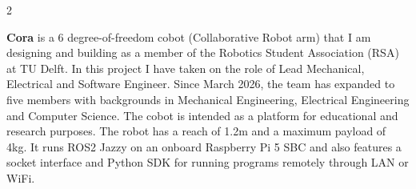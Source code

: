 \documentclass[8pt, a4paper, withhyper]{altacv}
\begin{document}
   


  \makecvheader


  \begin{paracol}
    {2}





    
     {}    
    \textbf{Cora} is a 6 degree-of-freedom cobot (Collaborative Robot arm) that I am
    designing and building as a member of the Robotics Student Association (RSA)
    at TU Delft. In this project I have taken on the role of Lead Mechanical,
    Electrical and Software Engineer. Since March 2026, the team has expanded 
    to five members with backgrounds in Mechanical Engineering, 
    Electrical Engineering and Computer Science.
    The cobot is intended as a platform for educational and research purposes.
    The robot has a reach of 1.2m and a maximum payload of 4kg.
    It runs ROS2 Jazzy on an onboard Raspberry Pi 5 SBC
    and also features a socket interface and Python SDK for running programs 
    remotely through LAN or WiFi.
    

\end{paracol}
\end{document}
